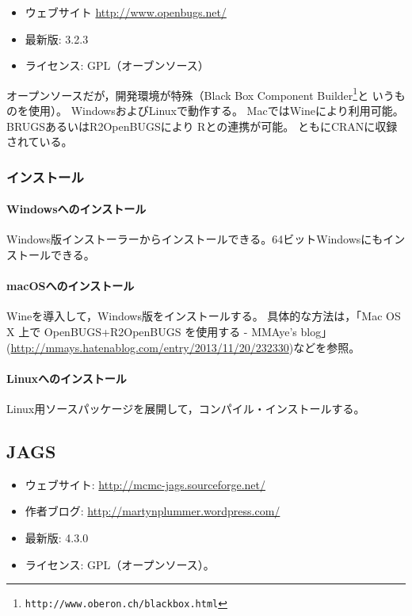 \documentclass[11pt,uplatex]{jsarticle}
\begin{document}
\begin{itemize}
\item ウェブサイト \url{http://www.openbugs.net/}
\item 最新版: 3.2.3
\item ライセンス: GPL（オーブンソース）
\end{itemize}

オープンソースだが，開発環境が特殊（Black Box Component
Builder\footnote{\texttt{http://www.oberon.ch/blackbox.html}}と
いうものを使用）。
WindowsおよびLinuxで動作する。
Macでは\textsf{Wine}により利用可能。
\textsf{BRUGS}あるいは\textsf{R2OpenBUGS}により
\textsf{R}との連携が可能\cite{Thomas}。
ともにCRANに収録されている。

\subsubsection*{インストール}
\paragraph{Windowsへのインストール}
Windows版インストーラーからインストールできる。64ビットWindowsにもインストールできる。

\paragraph{macOSへのインストール}
\textsf{Wine}を導入して，Windows版をインストールする。
具体的な方法は，「Mac OS X 上で OpenBUGS+R2OpenBUGS を使用する - MMAye's blog」
(\url{http://mmays.hatenablog.com/entry/2013/11/20/232330})などを参照。

\paragraph{Linuxへのインストール}
Linux用ソースパッケージを展開して，コンパイル・インストールする。

\subsection{JAGS}

\begin{itemize}
\item ウェブサイト:
  \url{http://mcmc-jags.sourceforge.net/}
\item 作者ブログ:
  \url{http://martynplummer.wordpress.com/}  
\item 最新版: 4.3.0
\item ライセンス: GPL（オープンソース）。
\end{itemize}
\end{document}
